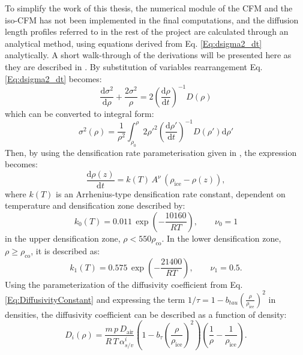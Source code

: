 \documentclass[../../CompleteThesis2/Complete_2ndDraft]{subfiles}
\begin{document}
To simplify the work of this thesis, the numerical module of the CFM and the iso-CFM has not been implemented in the final computations, and the diffusion length profiles referred to in the rest of the project are calculated through an analytical method, using equations derived from Eq. \ref{Eq:dsigma2_dt} analytically. A short walk-through of the derivations will be presented here as they are described in \cite[Gkinis et al., 2021]{Gkinis2021}.
By substitution of variables rearrangement Eq. \ref{Eq:dsigma2_dt} becomes:
\begin{equation}
	\frac{\text{d}\sigma^2}{\text{d}\rho} + \frac{2\sigma^2}{\rho} = 2\left(\frac{\text{d}\rho}{\text{d}t}\right)^{-1}D(\rho)
	\label{Eq:dsigma_dt_rearrange}
\end{equation}
which can be converted to integral form:
\begin{equation}
	\sigma^2(\rho) = \frac{1}{\rho^2}\int_{\rho_0}^{\rho}2\rho'^2\left(\frac{\text{d}\rho'}{\text{d}t}\right)^{-1}D(\rho')\text{d}\rho'
	\label{Eq:sigma2_rho_integral}
\end{equation}
Then, by using the densification rate parameterisation given in \cite[Herron and Langway, 1980]{HerronLangway1980}, the expression becomes:
\begin{equation}
	\frac{\text{d}\rho(z)}{\text{d}t} = k(T)\, A^{\nu}\, (\rho_{\text{ice}} - \rho(z)),
	\label{Eq:drho_dt}
\end{equation}
where $k(T)$ is an Arrhenius-type densification rate constant, dependent on temperature and densification zone described by:
\begin{equation}
	k_0(T) = 0.011\, \exp\left(-\frac{10160}{RT}\right), \qquad \nu_0 = 1
	\label{Eq:ArrCoeff_Zone1}
\end{equation}
in the upper densification zone, $\rho < 550 \rho_{\text{co}}$. In the lower densification zone, $\rho \geq \rho_{\text{co}}$, it is described as:
\begin{equation}
	k_1(T) = 0.575\, \exp\left(-\frac{21400}{RT}\right), \qquad \nu_1 = 0.5.
	\label{Eq:ArrCoeff_Zone2}
\end{equation}
Using the parameterization of the diffusivity coefficient from Eq. \ref{Eq:DiffusivityConstant} and expressing the term $1/\tau = 1-b_{tau}\left(\frac{\rho}{\rho_{\text{ice}}}\right)^2$ in densities, the diffusivity coefficient can be described as a function of density:
\begin{equation}
	D_i(\rho) = \frac{m \, p \, D_{\text{air}}}{R \, T \, \alpha_{s/v}^i}\left(1-b_{\tau}\left(\frac{\rho}{\rho_{\text{ice}}}\right)^2\right)\left(\frac{1}{\rho} - \frac{1}{\rho_{\text{ice}}}\right).
	\label{Eq:DiffusivityConstant_2}
\end{equation}
\end{document}
